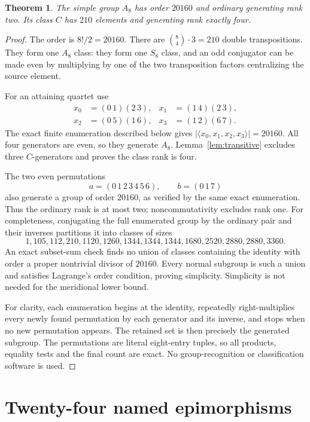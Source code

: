 \documentclass[11pt]{article}
\newtheorem{theorem}{Theorem}
\begin{document}
\begin{theorem}\label{thm:group}
The simple group $A_8$ has order $20160$ and ordinary generating
rank two. Its class $C$ has $210$ elements and generating rank exactly
four.
\end{theorem}
\begin{proof}
The order is $8!/2=20160$. There are $\binom84\cdot3=210$ double
transpositions. They form one $A_8$ class: they form one $S_8$ class,
and an odd conjugator can be made even by multiplying by one of the
two transposition factors centralizing the source element.

For an attaining quartet use
\[
\begin{aligned}
 x_0&=(0\,1)(2\,3),&x_1&=(1\,4)(2\,3),\\
 x_2&=(0\,5)(1\,6),&x_3&=(1\,2)(6\,7).
\end{aligned}
\]
The exact finite enumeration described below gives
$|\langle x_0,x_1,x_2,x_3\rangle|=20160$. All four generators are even,
so they generate $A_8$. Lemma~\ref{lem:transitive} excludes three
$C$-generators and proves the class rank is four.

The two even permutations
\[
             a=(0\,1\,2\,3\,4\,5\,6),\qquad b=(0\,1\,7)
\]
also generate a group of order $20160$, as verified by the same exact
enumeration. Thus the ordinary rank is at most two; noncommutativity
excludes rank one. For completeness, conjugating the full enumerated group by the
ordinary pair and their inverses partitions it into classes of sizes
\[
1,105,112,210,1120,1260,1344,1344,1344,1680,2520,2880,2880,3360.
\]
An exact subset-sum check finds no union of classes containing the
identity with order a proper nontrivial divisor of $20160$.
Every normal subgroup is such a union and satisfies Lagrange's
order condition, proving simplicity. Simplicity is not needed for
the meridional lower bound.

For clarity, each enumeration begins at the identity, repeatedly
right-multiplies every newly found permutation by each generator and
its inverse, and stops when no new permutation appears. The retained
set is then precisely the generated subgroup. The permutations are
literal eight-entry tuples, so all products, equality tests and the
final count are exact. No group-recognition or classification software
is used.
\end{proof}

\section{Twenty-four named epimorphisms}
\end{document}
